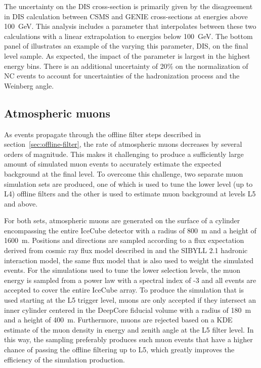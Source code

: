 The uncertainty on the DIS cross-section is primarily given by the disagreement in DIS calculation between CSMS and GENIE cross-sections at energies above 100~GeV. This analysis includes a parameter that interpolates between these two calculations with a linear extrapolation to energies below 100~GeV.
The bottom panel of  illustrates an example of the varying this parameter, DIS, on the final level sample. As expected, the impact of the parameter is largest in the highest energy bins. There is an additional uncertainty of 20\% on the normalization of NC events to account for uncertainties of the hadronization process and the Weinberg angle.

\subsection{Atmospheric muons}
As events propagate through the offline filter steps described in section~\ref{sec:offline-filter}, the rate of atmospheric muons decreases by several orders of magnitude. This makes it challenging to produce a sufficiently large amount of simulated muon events to accurately estimate the expected background at the final level. To overcome this challenge, two separate muon simulation sets are produced, one of which is used to tune the lower level (up to L4) offline filters and the other is used to estimate muon background at levels L5 and above. 

For both sets, atmospheric muons are generated on the surface of a cylinder encompassing the entire IceCube detector with a radius of 800~m and a height of 1600~m. Positions and directions are sampled according to a flux expectation derived from cosmic ray flux model described in  and the \textsc{SIBYLL 2.1} hadronic interaction model, the same flux model that is also used to weight the simulated events. For the simulations used to tune the lower selection levels, the muon energy is sampled from a power law with a spectral index of -3 and all events are accepted to cover the entire IceCube array. To produce the simulation that is used starting at the L5 trigger level, muons are only accepted if they intersect an inner cylinder centered in the DeepCore fiducial volume with a radius of 180~m and a height of 400~m. Furthermore, muons are rejected based on a KDE estimate of the muon density in energy and zenith angle at the L5 filter level. In this way, the sampling preferably produces such muon events that have a higher chance of passing the offline filtering up to L5, which greatly improves the efficiency of the simulation production.


